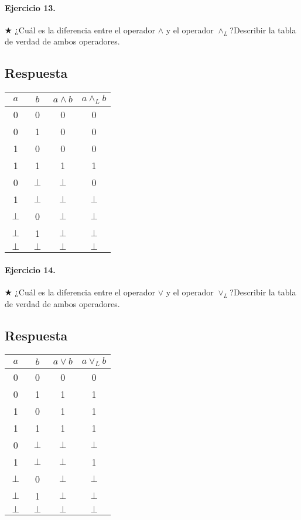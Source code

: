 \documentclass[a4paper]{article}
\begin{document}
\paragraph{\textbf{Ejercicio 13.}} $\bigstar$ ¿Cuál es la diferencia entre el operador $\wedge $ y el operador $\wedge _{L} $?Describir la tabla de verdad de ambos operadores. 

\subsection*{Respuesta}
\begin{center}
\begin{tabular}{|c|c|c|c|}
\hline 
$a$ & $b$ & $a\wedge b$ & $a\wedge _L b$ \\ 
\hline 
0 & 0 & 0 & 0 \\ 
\hline 
0 & 1 & 0 & 0 \\ 
\hline 
1 & 0 & 0 & 0 \\ 
\hline 
1 & 1 & 1 & 1 \\ 
\hline 
0 & $ \perp$ & $ \perp$ & 0 \\ 
\hline 
1 & $ \perp$ & $ \perp$ & $ \perp$ \\ 
\hline 
$ \perp$ & 0 & $ \perp$ & $ \perp$ \\ 
\hline 
$ \perp$ & 1 & $ \perp$ & $ \perp$ \\ 
\hline 
$ \perp$ & $ \perp$ & $ \perp$ & $ \perp$ \\ 
\hline 
\end{tabular} 
\end{center}

\paragraph{\textbf{Ejercicio 14.}} $\bigstar$ ¿Cuál es la diferencia entre el operador $\vee $ y el operador $\vee _{L} $?Describir la tabla de verdad de ambos operadores.

\subsection*{Respuesta}
\begin{center}
\begin{tabular}{|c|c|c|c|}
\hline 
$a$ & $b$ & $a\vee b$ & $a\vee _L b$ \\ 
\hline 
0 & 0 & 0 & 0 \\ 
\hline 
0 & 1 & 1 & 1 \\ 
\hline 
1 & 0 & 1 & 1 \\ 
\hline 
1 & 1 & 1 & 1 \\ 
\hline 
0 & $ \perp$ & $ \perp$ & $\perp$ \\ 
\hline 
1 & $ \perp$ & $ \perp$ &  1 \\ 
\hline 
$ \perp$ & 0 & $ \perp$ & $ \perp$ \\ 
\hline 
$ \perp$ & 1 & $ \perp$ & $ \perp$ \\ 
\hline 
$ \perp$ & $ \perp$ & $ \perp$ & $ \perp$ \\ 
\hline 
\end{tabular} 
\end{center}
\end{document}
